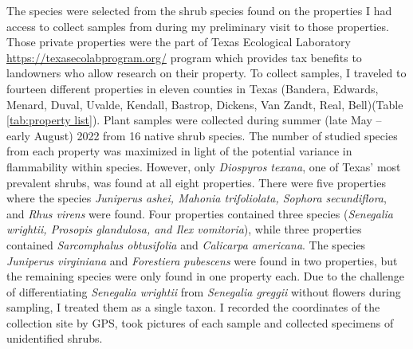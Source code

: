 \documentclass{ttuthes2007}
\begin{document}
The species were selected from the shrub species found on the properties I had access to collect samples from during my preliminary visit to those properties. Those private properties were the part of Texas Ecological Laboratory  \url{https://texasecolabprogram.org/} program which provides tax benefits to landowners who allow research on their property.  To collect samples, I traveled to fourteen different properties in eleven counties in Texas (Bandera, Edwards, Menard, Duval, Uvalde, Kendall, Bastrop, Dickens, Van Zandt, Real, Bell)(Table \ref{tab:property list}).   %
Plant samples were collected during summer (late May -- early August) 2022 from 16 native shrub species. The number of studied species from each property was maximized in light of the potential variance in flammability within species. However, only \emph{Diospyros texana}, one of Texas' most prevalent shrubs, was found at all eight properties. There were five properties where the species \emph{Juniperus ashei, Mahonia trifoliolata, Sophora secundiflora}, and \emph{Rhus virens} were found. Four properties contained three species (\emph{Senegalia wrightii, Prosopis glandulosa, and Ilex vomitoria}), while three properties contained \emph{Sarcomphalus obtusifolia} \citep{hauenschild2016phylogenetic} and \emph{Calicarpa americana}. The species \emph{Juniperus virginiana} and \emph{Forestiera pubescens} were found in two properties, but the remaining species were only found in one property each. %
 Due to the challenge of differentiating \emph{Senegalia wrightii} from \emph{Senegalia greggii} without flowers during sampling, I treated them as a single taxon. I recorded the coordinates of the collection site by GPS, took pictures of each sample  and collected specimens of unidentified shrubs.
\end{document}
